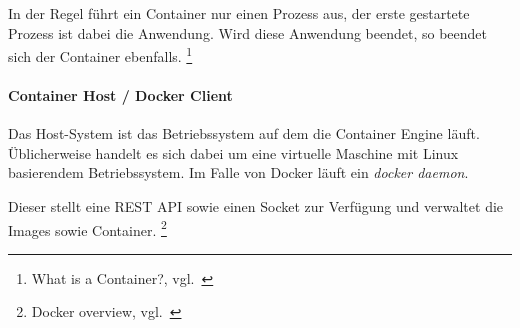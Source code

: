 In der Regel führt ein Container nur einen Prozess aus, der erste gestartete Prozess ist dabei die Anwendung.
Wird diese Anwendung beendet, so beendet sich der Container ebenfalls.
\footnote{What is a Container?, vgl.~\cite{DOCKER_WEBSITE}}

%
%
%
%
%

\paragraph{Container Host / Docker Client}

Das Host-System ist das Betriebssystem auf dem die Container Engine läuft.
Üblicherweise handelt es sich dabei um eine virtuelle Maschine mit Linux basierendem Betriebssystem.
Im Falle von Docker läuft ein \textit{docker daemon}.

Dieser stellt eine REST API sowie einen Socket zur Verfügung und verwaltet die Images sowie Container.
\footnote{Docker overview, vgl.~\cite{DOCKER_OVERVIEW}}

